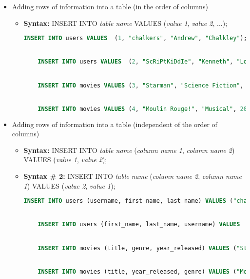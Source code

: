\documentclass[12pt]{article}
\begin{document}
\begin{itemize}
    \item Adding rows of information into a table (in the order of columns)
    \begin{itemize}
        \item \textbf{Syntax:} INSERT INTO \textit{table name} VALUES (\textit{value 1}, \textit{value 2}, ...);

    \begin{lstlisting}[language=SQL]
    INSERT INTO users VALUES  (1, "chalkers", "Andrew", "Chalkley");


    INSERT INTO users VALUES  (2, "ScRiPtKiDdIe", "Kenneth", "Love");


    INSERT INTO movies VALUES (3, "Starman", "Science Fiction", 1984);


    INSERT INTO movies VALUES (4, "Moulin Rouge!", "Musical", 2001);
    \end{lstlisting}

    \end{itemize}

    \item Adding rows of information into a table (independent of the order of columns)
    \begin{itemize}
        \item \textbf{Syntax:} INSERT INTO \textit{table name} (\textit{column name 1}, \textit{column name 2}) VALUES (\textit{value 1}, \textit{value 2});
        \item \textbf{Syntax \# 2:} INSERT INTO \textit{table name} (\textit{column name 2}, \textit{column name 1}) VALUES (\textit{value 2}, \textit{value 1});

    \begin{lstlisting}[language=SQL]
    INSERT INTO users (username, first_name, last_name) VALUES ("chalkers", "Andrew", "Chalkley");


    INSERT INTO users (first_name, last_name, username) VALUES  ("Kenneth", "Love", "ScRiPtKiDdIe");


    INSERT INTO movies (title, genre, year_released) VALUES ("Starman", "Science Fiction", 1984);


    INSERT INTO movies (title, year_released, genre) VALUES ("Moulin Rouge!", 2001,  "Musical");
    \end{lstlisting}

    \end{itemize}
\end{itemize}

\bigskip
\end{document}
